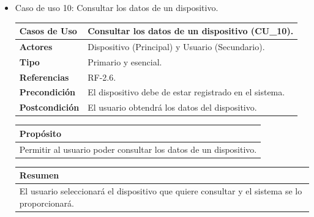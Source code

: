 \begin{itemize}
    \newpage
    
    \item Caso de uso 10: Consultar los datos de un dispositivo.
    
    \begin{table}[h!]
        \centering
        \begin{tabular}{|l|p{}|}
            \hline
            \textbf{Casos de Uso}   &   Consultar los datos de un dispositivo (CU\_10). \\
            \hline 
            \textbf{Actores}        &   Dispositivo (Principal) y Usuario (Secundario). \\ 
            \hline 
            \textbf{Tipo}           &   Primario y esencial. \\ 
            \hline
            \textbf{Referencias}    &   RF-2.6. \\ 
            \hline
            \textbf{Precondición}   &   El dispositivo debe de estar registrado en el sistema. \\ 
            \hline
            \textbf{Postcondición}  &   El usuario obtendrá los datos del dispositivo. \\ 
            \hline
        \end{tabular}
        
        \vspace{5mm}
        
        \begin{tabular}{|p{\textwidth}|}
            \hline
            \rowcolor{SeaGreen} \textbf{Propósito} \\
            \hline
            \multicolumn{1}{|p{12cm}|}{Permitir al usuario poder consultar los datos de un dispositivo.} \\ [0.5ex]
            \hline
        \end{tabular}
        
        \vspace{5mm}
        
        \begin{tabular}{|p{\textwidth}|}
            \hline
            \rowcolor{SeaGreen} \textbf{Resumen} \\
            \hline
            \multicolumn{1}{|p{12cm}|}{El usuario seleccionará el dispositivo que quiere consultar y el sistema se lo 
            proporcionará.} \\ [0.5ex]
            \hline
        \end{tabular}
        

\end{table}
\end{itemize}
